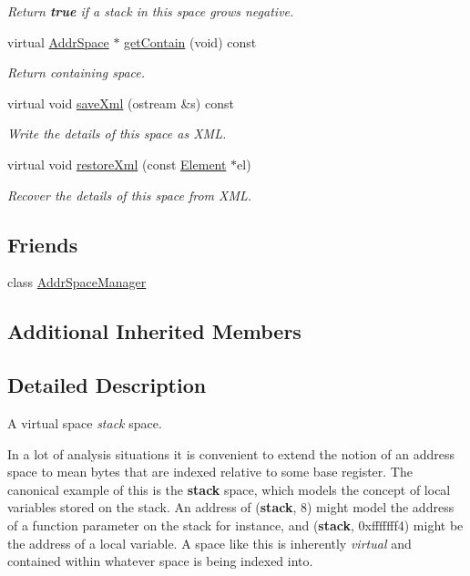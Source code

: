 \begin{DoxyCompactItemize}
\begin{DoxyCompactList}\small\item\em Return {\bfseries{true}} if a stack in this space grows negative. \end{DoxyCompactList}\item 
virtual \mbox{\hyperlink{class_addr_space}{Addr\+Space}} $\ast$ \mbox{\hyperlink{class_spacebase_space_a4d673d57ee17e7b0d99b7152bf1c57ec}{get\+Contain}} (void) const
\begin{DoxyCompactList}\small\item\em Return containing space. \end{DoxyCompactList}\item 
virtual void \mbox{\hyperlink{class_spacebase_space_ae98cc5d0f6f46274b1942aca597ce2ce}{save\+Xml}} (ostream \&s) const
\begin{DoxyCompactList}\small\item\em Write the details of this space as X\+ML. \end{DoxyCompactList}\item 
virtual void \mbox{\hyperlink{class_spacebase_space_adb45445a3286d78920f1c96074dd6229}{restore\+Xml}} (const \mbox{\hyperlink{class_element}{Element}} $\ast$el)
\begin{DoxyCompactList}\small\item\em Recover the details of this space from X\+ML. \end{DoxyCompactList}\end{DoxyCompactItemize}
\subsection*{Friends}
\begin{DoxyCompactItemize}
\item 
class \mbox{\hyperlink{class_spacebase_space_a0e578f3e90e10ec045899c0e9cb65d46}{Addr\+Space\+Manager}}
\end{DoxyCompactItemize}
\subsection*{Additional Inherited Members}


\subsection{Detailed Description}
A virtual space {\itshape stack} space. 

In a lot of analysis situations it is convenient to extend the notion of an address space to mean bytes that are indexed relative to some base register. The canonical example of this is the {\bfseries{stack}} space, which models the concept of local variables stored on the stack. An address of ({\bfseries{stack}}, 8) might model the address of a function parameter on the stack for instance, and ({\bfseries{stack}}, 0xfffffff4) might be the address of a local variable. A space like this is inherently {\itshape virtual} and contained within whatever space is being indexed into. 

